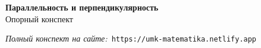 \documentclass{umk-matematika}
\begin{document}
\begin{center}
{\Large\bfseries Параллельность и перпендикулярность}
\\[0.3cm]{\large Опорный конспект}
\end{center}
\vspace{0.5cm}

\begin{center}
\textit{Полный конспект на сайте:}\
\texttt{https://umk-matematika.netlify.app}
\end{center}
\end{document}
